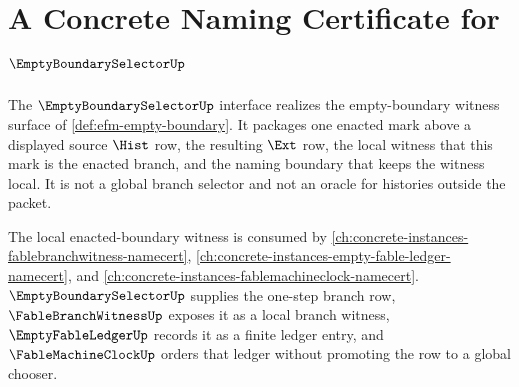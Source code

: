 \chapter{A Concrete Naming Certificate for $\EmptyBoundarySelectorUp$}
\label{ch:concrete-instances-emptyboundaryselector-namecert}

The $\EmptyBoundarySelectorUp$ interface realizes the empty-boundary witness surface of \autoref{def:efm-empty-boundary}. It packages one enacted mark above a displayed source $\Hist$ row, the resulting $\Ext$ row, the local witness that this mark is the enacted branch, and the naming boundary that keeps the witness local. It is not a global branch selector and not an oracle for histories outside the packet.

The local enacted-boundary witness is consumed by \autoref{ch:concrete-instances-fablebranchwitness-namecert}, \autoref{ch:concrete-instances-empty-fable-ledger-namecert}, and \autoref{ch:concrete-instances-fablemachineclock-namecert}. $\EmptyBoundarySelectorUp$ supplies the one-step branch row, $\FableBranchWitnessUp$ exposes it as a local branch witness, $\EmptyFableLedgerUp$ records it as a finite ledger entry, and $\FableMachineClockUp$ orders that ledger without promoting the row to a global chooser.

